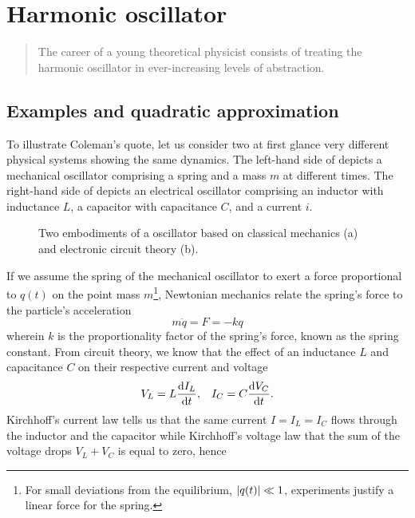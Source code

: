 \section{Harmonic oscillator}

\blockcquote{Sidney Coleman}{The career of a young theoretical physicist consists of treating the harmonic oscillator in ever-increasing levels of abstraction.}

\subsection{Examples and quadratic approximation}

To illustrate Coleman's quote, let us consider two at first glance very different physical systems showing the same dynamics.
The left-hand side of  depicts a mechanical oscillator comprising a spring and a mass $m$ at different times.
The right-hand side of  depicts an electrical oscillator comprising an inductor with inductance $L$, a capacitor with capacitance $C$, and a current $i$.
\begin{figure}[htb]
    \centering
    \qquad
    \caption{Two embodiments of a oscillator based on classical mechanics (a) and electronic circuit theory (b).}\label{fig:ho}
\end{figure}
If we assume the spring of the mechanical oscillator to exert a force proportional to $q(t)$ on the point mass $m$\footnote{For small deviations from the equilibrium, $\abs{q(t)}\ll1$, experiments justify a linear force for the spring.}, Newtonian mechanics relate the spring's force to the particle's acceleration
\begin{equation}
    m\ddot{q}
    =
    F
    =
    -kq
    \label{eq:ho_newton}
\end{equation}
wherein $k$ is the proportionality factor of the spring's force, known as the spring constant.
From circuit theory, we know that the effect of an inductance $L$ and capacitance $C$ on their respective current and voltage
\begin{align}
    V_L
    =
    L\dv{I_L}{t}
    ,&&
    I_C
    =
    C\dv{V_C}{t}
    .
\end{align}
Kirchhoff's current law tells us that the same current $I=I_L=I_C$ flows through the inductor and the capacitor while Kirchhoff's voltage law that the sum of the voltage drops $V_L+V_C$ is equal to zero, hence
